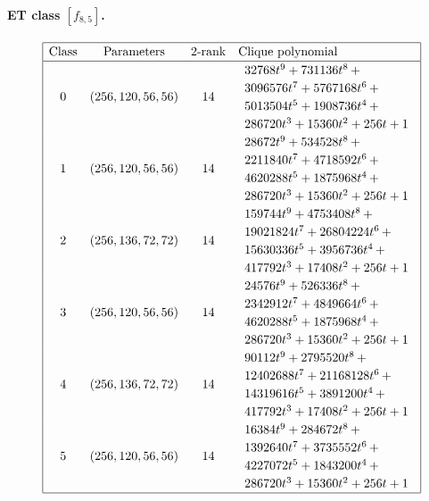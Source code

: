 \documentclass[12pt,a4paper]{article}
\begin{document}
\paragraph*{ET class $[f_{8,5}]$.}

\small{}
\begin{align*}
\def\arraystretch{1.2}
\begin{array}{|cccl|}
\hline
\text{Class} &
\text{Parameters} &
\text{2-rank} &
\text{Clique polynomial}
\\
\hline
0 &
(256, 120, 56, 56) &
14 &
\begin{array}{l}
32768t^{9} + 731136t^{8}
\,+
\\
 3096576t^{7} + 5767168t^{6}
\,+
\\
 5013504t^{5} + 1908736t^{4}
\,+
\\
 286720t^{3} + 15360t^{2} + 256t + 1
\end{array}
\\
1 &
(256, 120, 56, 56) &
14 &
\begin{array}{l}
28672t^{9} + 534528t^{8}
\,+
\\
 2211840t^{7} + 4718592t^{6}
\,+
\\
 4620288t^{5} + 1875968t^{4}
\,+
\\
 286720t^{3} + 15360t^{2} + 256t + 1
\end{array}
\\
2 &
(256, 136, 72, 72) &
14 &
\begin{array}{l}
159744t^{9} + 4753408t^{8}
\,+
\\
 19021824t^{7} + 26804224t^{6}
\,+
\\
 15630336t^{5} + 3956736t^{4}
\,+
\\
 417792t^{3} + 17408t^{2} + 256t + 1
\end{array}
\\
3 &
(256, 120, 56, 56) &
14 &
\begin{array}{l}
24576t^{9} + 526336t^{8}
\,+
\\
 2342912t^{7} + 4849664t^{6}
\,+
\\
 4620288t^{5} + 1875968t^{4}
\,+
\\
 286720t^{3} + 15360t^{2} + 256t + 1
\end{array}
\\
4 &
(256, 136, 72, 72) &
14 &
\begin{array}{l}
90112t^{9} + 2795520t^{8}
\,+
\\
 12402688t^{7} + 21168128t^{6}
\,+
\\
 14319616t^{5} + 3891200t^{4}
\,+
\\
 417792t^{3} + 17408t^{2} + 256t + 1
\end{array}
\\
5 &
(256, 120, 56, 56) &
14 &
\begin{array}{l}
16384t^{9} + 284672t^{8}
\,+
\\
 1392640t^{7} + 3735552t^{6}
\,+
\\
 4227072t^{5} + 1843200t^{4}
\,+
\\
 286720t^{3} + 15360t^{2} + 256t + 1
\end{array}
\\
\hline
\end{array}
\end{align*}
\end{document}
